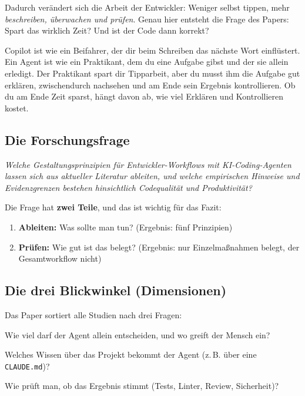 \documentclass[11pt,a4paper,parskip=half]{scrartcl}
\begin{document}
Dadurch verändert sich die Arbeit der Entwickler: Weniger selbst tippen, mehr \emph{beschreiben, überwachen und prüfen}. Genau hier entsteht die Frage des Papers: Spart das wirklich Zeit? Und ist der Code dann korrekt?

\begin{beispiel}
Copilot ist wie ein Beifahrer, der dir beim Schreiben das nächste Wort einflüstert. Ein Agent ist wie ein Praktikant, dem du eine Aufgabe gibst und der sie allein erledigt. Der Praktikant spart dir Tipparbeit, aber du musst ihm die Aufgabe gut erklären, zwischendurch nachsehen und am Ende sein Ergebnis kontrollieren. Ob du am Ende Zeit sparst, hängt davon ab, wie viel Erklären und Kontrollieren kostet.
\end{beispiel}

\subsection{Die Forschungsfrage}
\begin{kernbox}[Forschungsfrage]
\emph{Welche Gestaltungsprinzipien für Entwickler-Workflows mit KI-Coding-Agenten lassen sich aus aktueller Literatur ableiten, und welche empirischen Hinweise und Evidenzgrenzen bestehen hinsichtlich Codequalität und Produktivität?}
\end{kernbox}
Die Frage hat \textbf{zwei Teile}, und das ist wichtig für das Fazit:
\begin{enumerate}
\item \textbf{Ableiten:} Was sollte man tun? (Ergebnis: fünf Prinzipien)
\item \textbf{Prüfen:} Wie gut ist das belegt? (Ergebnis: nur Einzelmaßnahmen belegt, der Gesamtworkflow nicht)
\end{enumerate}

\subsection{Die drei Blickwinkel (Dimensionen)}
Das Paper sortiert alle Studien nach drei Fragen:
\begin{description}[leftmargin=2.8cm,style=nextline]
\item[Autonomie] Wie viel darf der Agent allein entscheiden, und wo greift der Mensch ein?
\item[Kontext] Welches Wissen über das Projekt bekommt der Agent (z.\,B. über eine \texttt{CLAUDE.md})?
\item[Qualitätssicherung] Wie prüft man, ob das Ergebnis stimmt (Tests, Linter, Review, Sicherheit)?
\end{description}
\end{document}
